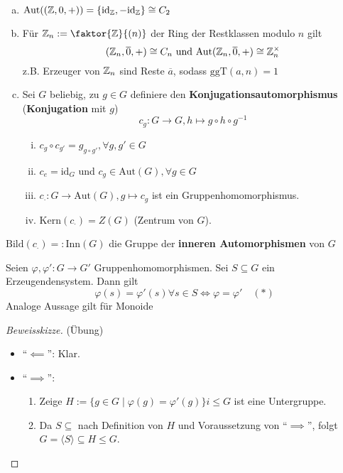 \documentclass[a4paper]{report}
\begin{document}
\begin{bsp}[Übung]\item
  \begin{enumerate}[(a)]
    \item $\mathrm{Aut}((\Bbb Z, 0, +)) = \{\mathrm{id}_{\Bbb Z}, - \mathrm{id}_{\Bbb Z}\} \cong C_{2}$
    \item Für $\Bbb Z_{n}:= \faktor{\Bbb Z}{(n)}$ der Ring der Restklassen modulo $n$ gilt
          $$(\Bbb Z_{n}, \overline 0, +) \cong C_{n} \text{ und } \mathrm{Aut}(\Bbb Z_{n}, \overline 0, +) \cong \Bbb Z_{n}^{\times}$$
          z.B. Erzeuger von $\Bbb Z_{n}$ sind Reste $\overline a$, sodass $\mathrm{ggT}(a,n) = 1$
    \item Sei $G$ beliebig, zu $g \in G$ definiere den \textbf{Konjugationsautomorphismus} (\textbf{Konjugation} mit $g$)
          $$c_{g}: G \to G, h \mapsto g\circ h \circ g^{-1}$$
\begin{enumerate}[(i)]
  \item $c_{g} \circ c_{g'} = g_{g\circ g'}, \forall g, g' \in G$
  \item $c_{e} = \mathrm{id}_{G}$ und $c_{g} \in \mathrm{Aut}(G), \forall g \in G$
  \item $c_{\cdot}: G \to \mathrm{Aut}(G), g \mapsto c_{g}$ ist ein Gruppenhomomorphismus.
  \item $\mathrm{Kern}(c_{\cdot}) = Z(G)$ (Zentrum von $G$).
\end{enumerate}
  \end{enumerate}
\end{bsp}
\begin{bem*}
$\mathrm{Bild}(c_{\cdot}) =: \mathrm{Inn}(G)$ die Gruppe der \textbf{inneren Automorphismen} von $G$
\end{bem*}

\begin{lemm}
  Seien $\varphi, \varphi' : G \to G'$ Gruppenhomomorphismen. Sei $S \subseteq G$ ein Erzeugendensystem. Dann gilt
  $$\varphi(s) = \varphi'(s) \forall s \in S \iff \varphi = \varphi'\quad (*)$$
  Analoge Aussage gilt für Monoide
\end{lemm}
\begin{proof}[Beweisskizze](Übung)
  \begin{itemize}
          \item ``$\impliedby$'': Klar.
    \item ``$\implies$'':
          \begin{enumerate}[1)]
            \item Zeige $H := \{g \in G \mid \varphi(g) = \varphi'(g)\}i \le G$ ist eine Untergruppe.
            \item Da $S \subseteq$ nach Definition von $H$ und Voraussetzung von ``$\implies$'', folgt $G = \langle S \rangle \subseteq H \le G$. \qedhere
          \end{enumerate}
  \end{itemize}
\end{proof}
\end{document}
